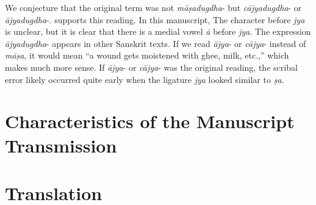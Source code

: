 We conjecture that the original term was not \emph{māṣadugdha}- 
but \emph{cājyadugdha}- or \emph{ājyadugdha}-. 
 supports this reading. 
In this manuscript, The character before \emph{jya} is unclear, 
but it is clear that there is a medial vowel \emph{ā} before \emph{jya}. 
The expression \emph{ājyadugdha}- appears in other Sanskrit texts. 
If we read \emph{ājya}- or \emph{cājya}- instead of \emph{māṣa}, 
it would mean “a wound gets moistened with ghee, milk, etc.,” 
which makes much more sense. 
If \emph{ājya}- or \emph{cājya}- was the original reading, 
the scribal error likely occurred quite early 
when the ligature \emph{jya} looked similar to \emph{ṣa}.

\section{Characteristics of the Manuscript Transmission}


\newpage
\section{Translation}

